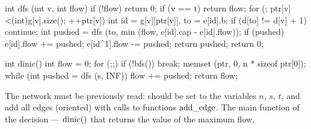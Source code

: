 int dfs (int v, int flow) {
if (!flow) return 0;
if (v == t) return flow;
for (; ptr[v]<(int)g[v].size(); ++ptr[v]) {
int id = g[v][ptr[v]],
to = e[id].b;
if (d[to] != d[v] + 1) continue;
int pushed = dfs (to, min (flow, e[id].cap - e[id].flow));
if (pushed) {
e[id].flow += pushed;
e[id^1].flow -= pushed;
return pushed;
}
}
return 0;
}

int dinic() {
int flow = 0;
for (;;) {
if (!bfs()) break;
memset (ptr, 0, n * sizeof ptr[0]);
while (int pushed = dfs (s, INF))
flow += pushed;
}
return flow;
}
\endcode

The network must be previously read: should be set to the variables $n$, $s$, $t$, and add all edges (oriented) with calls to functions $\rm add\_edge$. The main function of the decision --- $\rm dinic ()$ that returns the value of the maximum flow.


